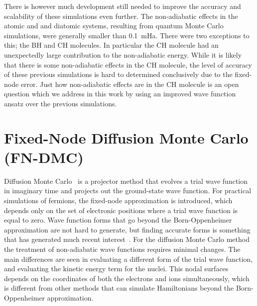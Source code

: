 \documentclass[aip,jcp,numerical,reprint]{revtex4-1}
\begin{document}
There is however much development still needed to improve the accuracy and scalability of these simulations even further.  The non-adiabatic effects in the atomic and and diatomic systems, resulting from quantum Monte Carlo simulations,  were generally smaller than 0.1~mHa. There were two exceptions to this; the BH and CH molecules. In particular the CH molecule had an unexpectedly large contribution to the non-adiabatic energy.   While it is likely that there is some non-adiabatic effects in the CH molecule, the level of accuracy of these previous simulations is hard to determined conclusively due to the fixed-node error.   Just how non-adiabatic effects are in the CH molecule is an open question which we address in this work by using an improved wave function ansatz over the previous simulations.


\section{Fixed-Node Diffusion Monte Carlo (FN-DMC)}
Diffusion Monte Carlo~\cite{Anderson_DMC,lester1,Stuart_Review,Needs_Review,Needs_Old_Review,QMC_Review} is a projector method that evolves a trial wave function in imaginary time and projects out the ground-state wave function. For practical simulations of fermions, the fixed-node approximation is introduced, which depends only on the set of electronic positions where a trial wave function is equal to zero.  %
  Wave function forms that go beyond the Born-Oppenheimer approximation are not hard to generate, but finding accurate forms is something that has generated  much recent interest~\cite{cederbaum1,cederbaum12,Tubman_ECG,boent,gross2014}.  For the diffusion Monte Carlo method the treatment of non-adiabatic wave functions requires minimal changes.  The main differences are seen in evaluating a different form of the trial wave function, and  evaluating the kinetic energy term for the nuclei.   This nodal surfaces  depends on the coordinates of both the electrons and ions simultaneously, which is different from other methods that can simulate Hamiltonians beyond the Born-Oppenheimer approximation\cite{mitroy2013,Kurt_XCNEO-HF,Sharon_NEO-DFT,kerley2013}.%
\end{document}

